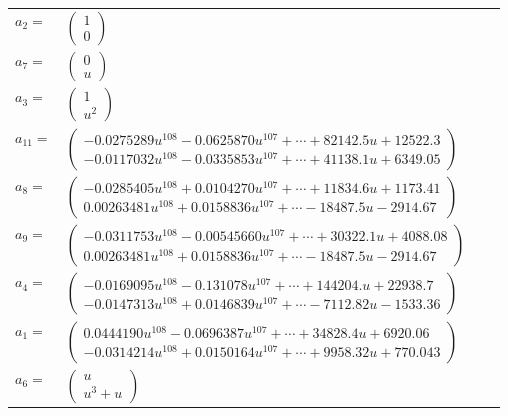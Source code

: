 \documentclass[1p]{elsarticle_modified}
\theoremstyle{definition}
\begin{document}
\begin{tabular}{m{7pt} m{180pt} m{7pt} m{180pt} }
\flushright $a_{2}=$&$\begin{pmatrix}1\\0\end{pmatrix}$ \\
\flushright $a_{7}=$&$\begin{pmatrix}0\\u\end{pmatrix}$ \\
\flushright $a_{3}=$&$\begin{pmatrix}1\\u^2\end{pmatrix}$ \\
\flushright $a_{11}=$&$\begin{pmatrix}-0.0275289 u^{108}-0.0625870 u^{107}+\cdots+82142.5 u+12522.3\\-0.0117032 u^{108}-0.0335853 u^{107}+\cdots+41138.1 u+6349.05\end{pmatrix}$ \\
\flushright $a_{8}=$&$\begin{pmatrix}-0.0285405 u^{108}+0.0104270 u^{107}+\cdots+11834.6 u+1173.41\\0.00263481 u^{108}+0.0158836 u^{107}+\cdots-18487.5 u-2914.67\end{pmatrix}$ \\
\flushright $a_{9}=$&$\begin{pmatrix}-0.0311753 u^{108}-0.00545660 u^{107}+\cdots+30322.1 u+4088.08\\0.00263481 u^{108}+0.0158836 u^{107}+\cdots-18487.5 u-2914.67\end{pmatrix}$ \\
\flushright $a_{4}=$&$\begin{pmatrix}-0.0169095 u^{108}-0.131078 u^{107}+\cdots+144204. u+22938.7\\-0.0147313 u^{108}+0.0146839 u^{107}+\cdots-7112.82 u-1533.36\end{pmatrix}$ \\
\flushright $a_{1}=$&$\begin{pmatrix}0.0444190 u^{108}-0.0696387 u^{107}+\cdots+34828.4 u+6920.06\\-0.0314214 u^{108}+0.0150164 u^{107}+\cdots+9958.32 u+770.043\end{pmatrix}$ \\
\flushright $a_{6}=$&$\begin{pmatrix}u\\u^3+u\end{pmatrix}$ \\

\end{tabular}
\end{document}
